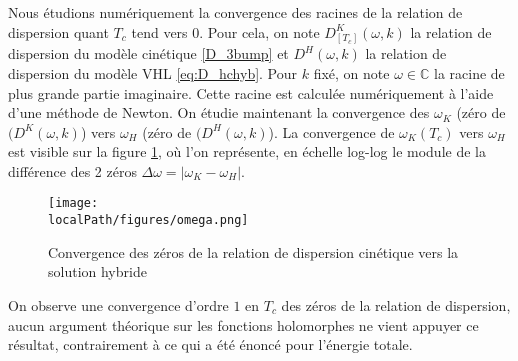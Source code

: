 Nous étudions numériquement la convergence des racines de la relation de dispersion quant $T_c$ tend vers $0$. Pour cela, on note $D^K_{[T_c]}(\omega,k)$ la relation de dispersion du modèle cinétique \eqref{D_3bump} et $D^H(\omega,k)$ la relation de dispersion du modèle VHL \eqref{eq:D_hchyb}. Pour $k$ fixé, on note $\omega\in\mathbb{C}$ la racine de plus grande partie imaginaire. 
Cette racine est calculée numériquement à l'aide d'une méthode de Newton. On étudie maintenant la convergence des $\omega_K$ (zéro de $(D^K(\omega,k)$) vers $\omega_H$ (zéro de $(D^H(\omega,k)$). La convergence de $\omega_K(T_c)$ vers $\omega_H$ est visible sur la figure \ref{fig:omega}, où l'on représente, en échelle log-log le module de la différence des 2 zéros $\Delta \omega = |\omega_K-\omega_H|$.
\begin{figure}[h!]
  \centering
  \texttt{[image: \\localPath/figures/omega.png]}
  \caption{Convergence des zéros de la relation de dispersion cinétique vers la solution hybride}
  \label{fig:omega}
\end{figure}
On observe une convergence d'ordre $1$ en $T_c$ des zéros de la relation de dispersion, aucun argument théorique sur les fonctions holomorphes ne vient appuyer ce résultat, contrairement à ce qui a été énoncé pour l'énergie totale.

